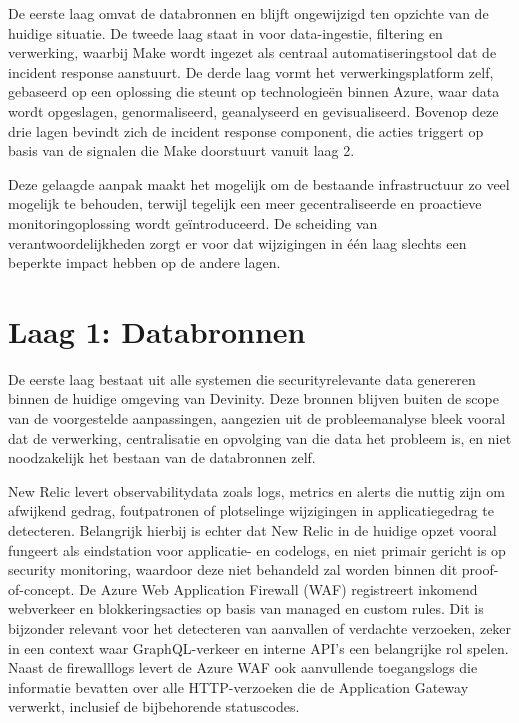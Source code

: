 De eerste laag omvat de databronnen en blijft ongewijzigd ten opzichte van de huidige situatie. De tweede laag staat in voor data-ingestie, filtering en verwerking, waarbij Make wordt ingezet als centraal automatiseringstool dat de incident response aanstuurt. De derde laag vormt het verwerkingsplatform zelf, gebaseerd op een oplossing die steunt op technologieën binnen Azure, waar data wordt opgeslagen, genormaliseerd, geanalyseerd en gevisualiseerd. Bovenop deze drie lagen bevindt zich de incident response component, die acties triggert op basis van de signalen die Make doorstuurt vanuit laag 2.

Deze gelaagde aanpak maakt het mogelijk om de bestaande infrastructuur zo veel mogelijk te behouden, terwijl tegelijk een meer gecentraliseerde en proactieve monitoringoplossing wordt geïntroduceerd. De scheiding van verantwoordelijkheden zorgt er voor dat wijzigingen in één laag slechts een beperkte impact hebben op de andere lagen.


\section{Laag 1: Databronnen}
De eerste laag bestaat uit alle systemen die securityrelevante data genereren binnen de huidige omgeving van Devinity. Deze bronnen blijven buiten de scope van de voorgestelde aanpassingen, aangezien uit de probleemanalyse bleek vooral dat de verwerking, centralisatie en opvolging van die data het probleem is, en niet noodzakelijk het bestaan van de databronnen zelf.

New Relic levert observabilitydata zoals logs, metrics en alerts die nuttig zijn om afwijkend gedrag, foutpatronen of plotselinge wijzigingen in applicatiegedrag te detecteren. Belangrijk hierbij is echter dat New Relic in de huidige opzet vooral fungeert als eindstation voor applicatie- en codelogs, en niet primair gericht is op security monitoring, waardoor deze niet behandeld zal worden binnen dit proof-of-concept. De Azure Web Application Firewall (WAF) registreert inkomend webverkeer en blokkeringsacties op basis van managed en custom rules. Dit is bijzonder relevant voor het detecteren van aanvallen of verdachte verzoeken, zeker in een context waar GraphQL-verkeer en interne API's een belangrijke rol spelen. Naast de firewalllogs levert de Azure WAF ook aanvullende toegangslogs die informatie bevatten over alle HTTP-verzoeken die de Application Gateway verwerkt, inclusief de bijbehorende statuscodes. 

